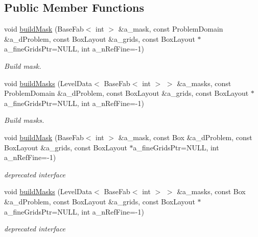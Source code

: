 \subsection*{Public Member Functions}
\begin{DoxyCompactItemize}
\item 
\hypertarget{class_mask_ab1652414426159d30e756e1da3a8932c}{void \hyperlink{class_mask_ab1652414426159d30e756e1da3a8932c}{build\-Mask} (Base\-Fab$<$ int $>$ \&a\-\_\-mask, const Problem\-Domain \&a\-\_\-d\-Problem, const Box\-Layout \&a\-\_\-grids, const Box\-Layout $\ast$a\-\_\-fine\-Grids\-Ptr=N\-U\-L\-L, int a\-\_\-n\-Ref\-Fine=-\/1)}\label{class_mask_ab1652414426159d30e756e1da3a8932c}

\begin{DoxyCompactList}\small\item\em Build mask. \end{DoxyCompactList}\item 
\hypertarget{class_mask_a2d53aed5c96ff103c2b54955a134c5af}{void \hyperlink{class_mask_a2d53aed5c96ff103c2b54955a134c5af}{build\-Masks} (Level\-Data$<$ Base\-Fab$<$ int $>$ $>$ \&a\-\_\-masks, const Problem\-Domain \&a\-\_\-d\-Problem, const Box\-Layout \&a\-\_\-grids, const Box\-Layout $\ast$a\-\_\-fine\-Grids\-Ptr=N\-U\-L\-L, int a\-\_\-n\-Ref\-Fine=-\/1)}\label{class_mask_a2d53aed5c96ff103c2b54955a134c5af}

\begin{DoxyCompactList}\small\item\em Build masks. \end{DoxyCompactList}\item 
\hypertarget{class_mask_a5df266dd84059e03b3e1e139c98c6c66}{void \hyperlink{class_mask_a5df266dd84059e03b3e1e139c98c6c66}{build\-Mask} (Base\-Fab$<$ int $>$ \&a\-\_\-mask, const Box \&a\-\_\-d\-Problem, const Box\-Layout \&a\-\_\-grids, const Box\-Layout $\ast$a\-\_\-fine\-Grids\-Ptr=N\-U\-L\-L, int a\-\_\-n\-Ref\-Fine=-\/1)}\label{class_mask_a5df266dd84059e03b3e1e139c98c6c66}

\begin{DoxyCompactList}\small\item\em deprecated interface \end{DoxyCompactList}\item 
\hypertarget{class_mask_ac62bddb04af6dbbe798a870a1e86c01c}{void \hyperlink{class_mask_ac62bddb04af6dbbe798a870a1e86c01c}{build\-Masks} (Level\-Data$<$ Base\-Fab$<$ int $>$ $>$ \&a\-\_\-masks, const Box \&a\-\_\-d\-Problem, const Box\-Layout \&a\-\_\-grids, const Box\-Layout $\ast$a\-\_\-fine\-Grids\-Ptr=N\-U\-L\-L, int a\-\_\-n\-Ref\-Fine=-\/1)}\label{class_mask_ac62bddb04af6dbbe798a870a1e86c01c}

\begin{DoxyCompactList}\small\item\em deprecated interface \end{DoxyCompactList}\end{DoxyCompactItemize}


